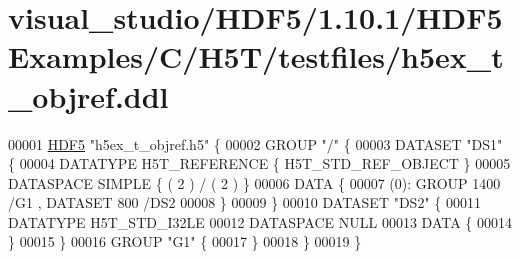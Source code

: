 \hypertarget{visual__studio_2_h_d_f5_21_810_81_2_h_d_f5_examples_2_c_2_h5_t_2testfiles_2h5ex__t__objref_8ddl_source}{}\section{visual\+\_\+studio/\+H\+D\+F5/1.10.1/\+H\+D\+F5\+Examples/\+C/\+H5\+T/testfiles/h5ex\+\_\+t\+\_\+objref.ddl}
\label{visual__studio_2_h_d_f5_21_810_81_2_h_d_f5_examples_2_c_2_h5_t_2testfiles_2h5ex__t__objref_8ddl_source}

\begin{DoxyCode}
00001 \hyperlink{namespace_h_d_f5}{HDF5} \textcolor{stringliteral}{"h5ex\_t\_objref.h5"} \{
00002 GROUP \textcolor{stringliteral}{"/"} \{
00003    DATASET \textcolor{stringliteral}{"DS1"} \{
00004       DATATYPE  H5T\_REFERENCE \{ H5T\_STD\_REF\_OBJECT \}
00005       DATASPACE  SIMPLE \{ ( 2 ) / ( 2 ) \}
00006       DATA \{
00007       (0): GROUP 1400 /G1 , DATASET 800 /DS2 
00008       \}
00009    \}
00010    DATASET \textcolor{stringliteral}{"DS2"} \{
00011       DATATYPE  H5T\_STD\_I32LE
00012       DATASPACE  NULL
00013       DATA \{
00014       \}
00015    \}
00016    GROUP \textcolor{stringliteral}{"G1"} \{
00017    \}
00018 \}
00019 \}
\end{DoxyCode}
